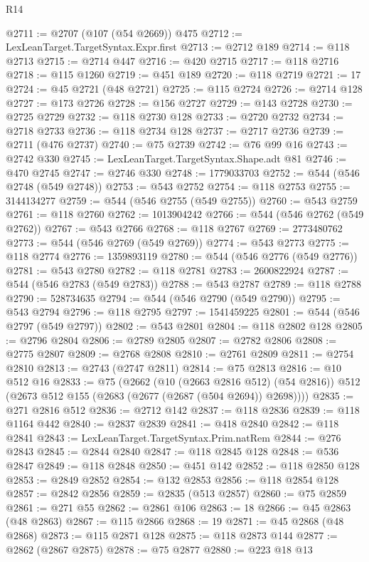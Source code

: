 \begin{lexlean}{R14}
\begin{coremodule}
@2711 := @2707 (@107 (@54 @2669)) @475
@2712 := LexLeanTarget.TargetSyntax.Expr.first
@2713 := @2712 @189
@2714 := @118 @2713
@2715 := @2714 @447
@2716 := @420 @2715
@2717 := @118 @2716
@2718 := @115 @1260
@2719 := @451 @189
@2720 := @118 @2719
@2721 := 17
@2724 := @45 @2721 (@48 @2721)
@2725 := @115 @2724
@2726 := @2714 @128
@2727 := @173 @2726
@2728 := @156 @2727
@2729 := @143 @2728
@2730 := @2725 @2729
@2732 := @118 @2730 @128
@2733 := @2720 @2732
@2734 := @2718 @2733
@2736 := @118 @2734 @128
@2737 := @2717 @2736
@2739 := @2711 (@476 @2737)
@2740 := @75 @2739
@2742 := @76 @99 @16
@2743 := @2742 @330
@2745 := LexLeanTarget.TargetSyntax.Shape.adt @81
@2746 := @470 @2745
@2747 := @2746 @330
@2748 := 1779033703
@2752 := @544 (@546 @2748 (@549 @2748))
@2753 := @543 @2752
@2754 := @118 @2753
@2755 := 3144134277
@2759 := @544 (@546 @2755 (@549 @2755))
@2760 := @543 @2759
@2761 := @118 @2760
@2762 := 1013904242
@2766 := @544 (@546 @2762 (@549 @2762))
@2767 := @543 @2766
@2768 := @118 @2767
@2769 := 2773480762
@2773 := @544 (@546 @2769 (@549 @2769))
@2774 := @543 @2773
@2775 := @118 @2774
@2776 := 1359893119
@2780 := @544 (@546 @2776 (@549 @2776))
@2781 := @543 @2780
@2782 := @118 @2781
@2783 := 2600822924
@2787 := @544 (@546 @2783 (@549 @2783))
@2788 := @543 @2787
@2789 := @118 @2788
@2790 := 528734635
@2794 := @544 (@546 @2790 (@549 @2790))
@2795 := @543 @2794
@2796 := @118 @2795
@2797 := 1541459225
@2801 := @544 (@546 @2797 (@549 @2797))
@2802 := @543 @2801
@2804 := @118 @2802 @128
@2805 := @2796 @2804
@2806 := @2789 @2805
@2807 := @2782 @2806
@2808 := @2775 @2807
@2809 := @2768 @2808
@2810 := @2761 @2809
@2811 := @2754 @2810
@2813 := @2743 (@2747 @2811)
@2814 := @75 @2813
@2816 := @10 @512 @16
@2833 := @75
    (@2662
      (@10 (@2663 @2816 @512) (@54 @2816))
      @512
      (@2673 @512 @155 (@2683 (@2677 (@2687 (@504 @2694)) @2698))))
@2835 := @271 @2816 @512
@2836 := @2712 @142
@2837 := @118 @2836
@2839 := @118 @1164 @442
@2840 := @2837 @2839
@2841 := @418 @2840
@2842 := @118 @2841
@2843 := LexLeanTarget.TargetSyntax.Prim.natRem
@2844 := @276 @2843
@2845 := @2844 @2840
@2847 := @118 @2845 @128
@2848 := @536 @2847
@2849 := @118 @2848
@2850 := @451 @142
@2852 := @118 @2850 @128
@2853 := @2849 @2852
@2854 := @132 @2853
@2856 := @118 @2854 @128
@2857 := @2842 @2856
@2859 := @2835 (@513 @2857)
@2860 := @75 @2859
@2861 := @271 @55
@2862 := @2861 @106
@2863 := 18
@2866 := @45 @2863 (@48 @2863)
@2867 := @115 @2866
@2868 := 19
@2871 := @45 @2868 (@48 @2868)
@2873 := @115 @2871 @128
@2875 := @118 @2873 @144
@2877 := @2862 (@2867 @2875)
@2878 := @75 @2877
@2880 := @223 @18 @13

\end{coremodule}
\end{lexlean}
